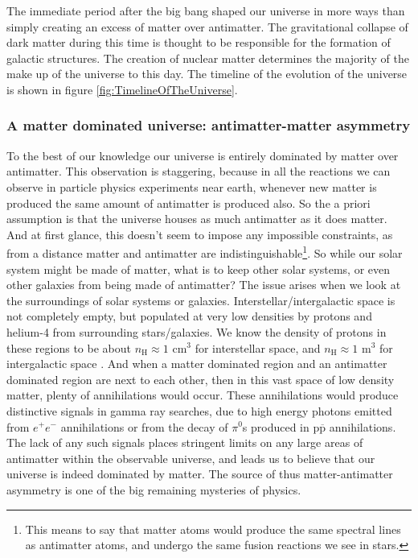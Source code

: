 The immediate period after the big bang shaped our universe in more ways than simply creating an excess of matter over antimatter. The gravitational collapse of dark matter during this time is thought to be responsible for the formation of galactic structures\cite{Ibarra_neutrinos}. The creation of nuclear matter determines the majority of the make up of the universe to this day. The timeline of the evolution of the universe is shown in figure \ref{fig:TimelineOfTheUniverse}.

\subsubsection{A matter dominated universe: antimatter-matter asymmetry}
To the best of our knowledge our universe is  entirely dominated by matter over antimatter. This observation is staggering, because in all the reactions we can observe in particle physics experiments near earth, whenever new matter is produced the same amount of antimatter is produced also\cite{}. So the a priori assumption is that the universe houses as much antimatter as it does matter. And at first glance, this doesn't seem to impose any impossible constraints, as from a distance matter and antimatter are indistinguishable\footnote{This means to say that matter atoms would produce the same spectral lines as antimatter atoms, and undergo the same fusion reactions we see in stars.}. So while our solar system might be made of matter, what is to keep other solar systems, or even other galaxies from being made of antimatter? The issue arises when we look at the surroundings of solar systems or galaxies. Interstellar/intergalactic space is not completely empty, but populated at very low densities by protons and helium-4 from surrounding stars/galaxies. We know the density of protons in these regions to be about $n_\mathrm{H} \approx 1$ cm$^3$ for interstellar space\cite{}, and $n_\mathrm{H} \approx 1$ m$^3$ for intergalactic space \cite{}. And when a matter dominated region and an antimatter dominated region are next to each other, then in this vast space of low density matter, plenty of annihilations would occur. These annihilations would produce distinctive signals in gamma ray searches, due to high energy photons emitted from $e^+e^-$ annihilations or from the decay of $\pi^0$s produced in $\mathrm{p}\overline{\mathrm{p}}$ annihilations\cite{Schönfelder1989}. The lack of any such signals places stringent limits on any large areas of antimatter within the observable universe, and leads us to believe that our universe is indeed dominated by matter. The source of thus matter-antimatter asymmetry is one of the big remaining mysteries of physics.  \\

